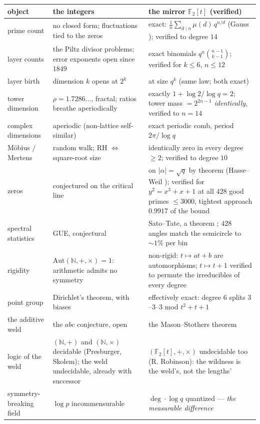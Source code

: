 \documentclass[11pt]{article}
\theoremstyle{remark}
\begin{document}
\begin{center}\small
\begin{tabular}{p{} p{} p{}}
\hline
object & the integers & the mirror $\mathbb{F}_2[t]$ (verified) \\
\hline
prime count & no closed form; fluctuations tied to the zeros & exact:
$\tfrac1n \sum_{d \mid n} \mu(d)\, q^{n/d}$ (Gauss \cite{LidlNiederreiter}); verified to degree
$14$ \\
layer counts & the Piltz divisor problems; error exponents open since $1849$ & exact binomials
$q^n \binom{n-1}{k-1}$; verified for $k \le 6$, $n \le 12$ \\
layer birth & dimension $k$ opens at $2^k$ & at size $q^k$ (same law; both exact) \\
tower dimension & $\rho = 1.7286\ldots$, fractal; ratios breathe aperiodically & exactly
$1 + \log 2/\log q = 2$; tower mass $= 2^{2n-1}$ \emph{identically}, verified to $n = 14$ \\
complex dimensions & aperiodic (non-lattice self-similar) & exact periodic comb, period
$2\pi/\log q$ \\
M\"obius / Mertens & random walk; RH $\Leftrightarrow$ square-root size & identically zero in every
degree $\ge 2$; verified to degree $10$ \\
zeros & conjectured on the critical line & on $|\alpha| = \sqrt{q}$ by theorem
(Hasse--Weil \cite{Hasse, Weil49}); verified for $y^2 = x^3 + x + 1$ at all $428$ good primes
$\le 3000$, tightest approach $0.9917$ of the bound \\
spectral statistics & GUE, conjectural \cite{Montgomery, Odlyzko} & Sato--Tate, a theorem
\cite{SatoTate}; $428$ angles match the semicircle to $\sim 1\%$ per bin \\
rigidity & $\mathrm{Aut}(\mathbb{N}, +, \times) = 1$: arithmetic admits no symmetry & non-rigid:
$t \mapsto at + b$ are automorphisms; $t \mapsto t{+}1$ verified to permute the irreducibles of
every degree \\
point group & Dirichlet's theorem, with biases & effectively exact: degree $6$ splits
$3$--$3$--$3$ mod $t^2 + t + 1$ \\
the additive weld & the $abc$ conjecture, open & the Mason--Stothers theorem
\cite{MasonStothers} \\
logic of the weld & $(\mathbb{N},+)$ and $(\mathbb{N},\times)$ decidable (Presburger,
Skolem); the weld undecidable, already with successor & $(\mathbb{F}_2[t],+,\times)$
undecidable too (R. Robinson): the wildness is the weld's, not the lengths' \\
symmetry-breaking field & $\log p$ incommensurable & $\deg \cdot \log q$ quantized --- \emph{the measurable difference} \\
\hline
\end{tabular}
\end{center}
\end{document}
